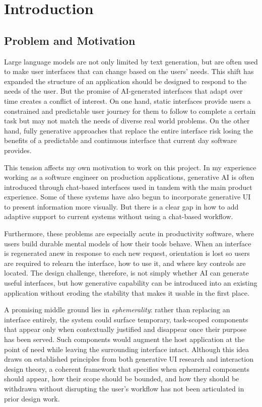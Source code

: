 \section{Introduction}

\subsection{Problem and Motivation}

Large language models are not only limited by text generation, but are often used to make user interfaces that can change based on the users' needs. This shift has expanded the structure of an application should be designed to respond to the needs of the user. But the promise of AI-generated interfaces that adapt over time creates a conflict of interest. On one hand, static interfaces provide users a constrained and predictable user journey for them to follow to complete a certain task but may not match the needs of diverse real world problems. On the other hand, fully generative approaches that replace the entire interface risk losing the benefits of a predictable and continuous interface that current day software provides.

This tension affects my own motivation to work on this project. In my experience working as a software engineer on production applications, generative AI is often introduced through chat-based interfaces used in tandem with the main product experience. Some of these systems have also begun to incorporate generative UI to present information more visually. But there is a clear gap in how to add adaptive support to current systems without using a chat-based workflow.

Furthermore, these problems are especially acute in productivity software, where users build durable mental models of how their tools behave. When an interface is regenerated anew in response to each new request, orientation is lost so users are required to relearn the interface, how to use it, and where key controls are located. The design challenge, therefore, is not simply whether AI can generate useful interfaces, but how generative capability can be introduced into an existing application without eroding the stability that makes it usable in the first place.

A promising middle ground lies in \emph{ephemerality}: rather than replacing an interface entirely, the system could surface temporary, task-scoped components that appear only when contextually justified and disappear once their purpose has been served. Such components would augment the host application at the point of need while leaving the surrounding interface intact. Although this idea draws on established principles from both generative UI research and interaction design theory, a coherent framework that specifies when ephemeral components should appear, how their scope should be bounded, and how they should be withdrawn without disrupting the user's workflow has not been articulated in prior design work.

